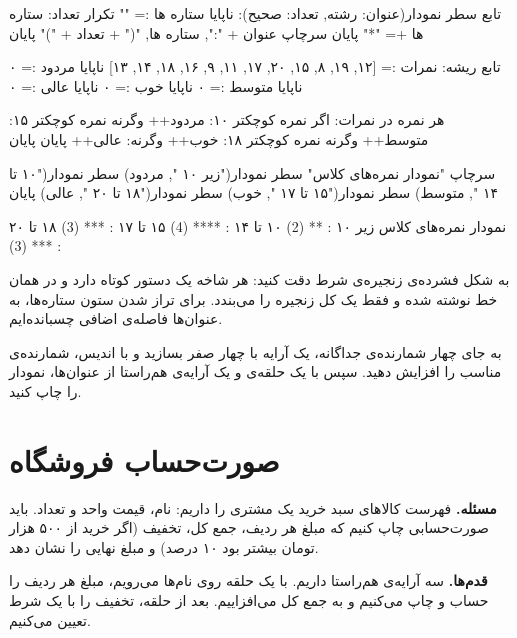 \begin{salamfa}
تابع سطر نمودار(عنوان: رشته, تعداد: صحیح):
    ناپایا ستاره ها := ""
    تکرار تعداد:
        ستاره ها += "*"
    پایان
    سرچاپ عنوان + ":", ستاره ها, "(" + تعداد + ")"
پایان

تابع ریشه:
    نمرات := [۱۲, ۱۹, ۸, ۱۵, ۲۰, ۱۷, ۱۱, ۹, ۱۶, ۱۸, ۱۴, ۱۳]
    ناپایا مردود := ۰
    ناپایا متوسط := ۰
    ناپایا خوب := ۰
    ناپایا عالی := ۰

    هر نمره در نمرات:
        اگر نمره کوچکتر ۱۰: مردود++
        وگرنه نمره کوچکتر ۱۵: متوسط++
        وگرنه نمره کوچکتر ۱۸: خوب++
        وگرنه: عالی++
        پایان
    پایان

    سرچاپ "نمودار نمره‌های کلاس"
    سطر نمودار("زیر ۱۰   ", مردود)
    سطر نمودار("۱۰ تا ۱۴ ", متوسط)
    سطر نمودار("۱۵ تا ۱۷ ", خوب)
    سطر نمودار("۱۸ تا ۲۰ ", عالی)
پایان
\end{salamfa}

\begin{outputfa}
نمودار نمره‌های کلاس
زیر ۱۰   : ** (2)
۱۰ تا ۱۴ : **** (4)
۱۵ تا ۱۷ : *** (3)
۱۸ تا ۲۰ : *** (3)
\end{outputfa}

به شکل فشرده‌ی زنجیره‌ی شرط دقت کنید: هر شاخه یک دستور کوتاه دارد و در
همان خط نوشته شده و فقط یک  کل زنجیره را می‌بندد. برای
تراز شدن ستون ستاره‌ها، به عنوان‌ها فاصله‌ی اضافی چسبانده‌ایم.

\begin{tip}
به جای چهار شمارنده‌ی جداگانه، یک آرایه با چهار صفر بسازید
و با اندیس، شمارنده‌ی مناسب را افزایش دهید. سپس با یک حلقه‌ی  و
یک آرایه‌ی هم‌راستا از عنوان‌ها، نمودار را چاپ کنید.
\end{tip}

\section{صورت‌حساب فروشگاه}

\textbf{مسئله.} فهرست کالاهای سبد خرید یک مشتری را داریم: نام، قیمت واحد و
تعداد. باید صورت‌حسابی چاپ کنیم که مبلغ هر ردیف، جمع کل، تخفیف (اگر خرید
از ۵۰۰ هزار تومان بیشتر بود ۱۰ درصد) و مبلغ نهایی را نشان دهد.

\textbf{قدم‌ها.} سه آرایه‌ی هم‌راستا داریم. با یک حلقه روی نام‌ها می‌رویم،
مبلغ هر ردیف را حساب و چاپ می‌کنیم و به جمع کل می‌افزاییم. بعد از حلقه،
تخفیف را با یک شرط تعیین می‌کنیم.

